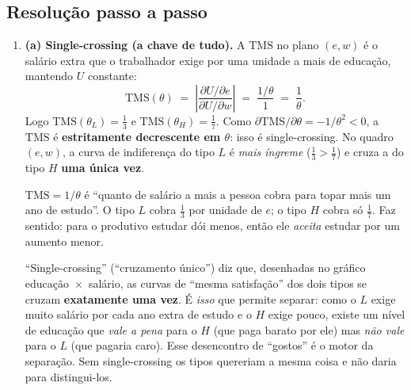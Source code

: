 \documentclass[11pt,a4paper]{article}
\newcommand{\TMS}{\text{TMS}}
\begin{document}
\subsection*{Resolução passo a passo}
\begin{enumerate}[leftmargin=2em,itemsep=4pt]

\item \textbf{(a) Single-crossing (a chave de tudo).} A $\TMS$ no plano $(e,w)$ é o salário
extra que o trabalhador exige por uma unidade a mais de educação, mantendo $U$ constante:
\[
\TMS(\theta) \;=\; \left|\frac{\partial U/\partial e}{\partial U/\partial w}\right|
\;=\; \frac{1/\theta}{1} \;=\; \frac{1}{\theta}. \tag{1.1}
\]
Logo $\TMS(\theta_L)=\tfrac13$ e $\TMS(\theta_H)=\tfrac17$. Como
$\partial\TMS/\partial\theta=-1/\theta^2<0$, a $\TMS$ é \textbf{estritamente decrescente em
$\theta$}: isso é single-crossing. No quadro $(e,w)$, a curva de indiferença do tipo $L$ é
\emph{mais íngreme} ($\tfrac13>\tfrac17$) e cruza a do tipo $H$ \textbf{uma única vez}.

\begin{empalavras}
$\TMS=1/\theta$ é ``quanto de salário a mais a pessoa cobra para topar mais um ano de estudo''.
O tipo $L$ cobra $\tfrac13$ por unidade de $e$; o tipo $H$ cobra só $\tfrac17$. Faz sentido:
para o produtivo estudar dói menos, então ele \emph{aceita} estudar por um aumento menor.

\smallskip\noindent
``Single-crossing'' (``cruzamento único'') diz que, desenhadas no gráfico
educação~$\times$~salário, as curvas de ``mesma satisfação'' dos dois tipos se cruzam
\textbf{exatamente uma vez}. É \emph{isso} que permite separar: como o $L$ exige muito salário
por cada ano extra de estudo e o $H$ exige pouco, existe um nível de educação que \emph{vale a
pena} para o $H$ (que paga barato por ele) mas \emph{não vale} para o $L$ (que pagaria caro).
Esse desencontro de ``gostos'' é o motor da separação. Sem single-crossing os tipos quereriam a
mesma coisa e não daria para distingui-los.
\end{empalavras}


\end{enumerate}
\end{document}
